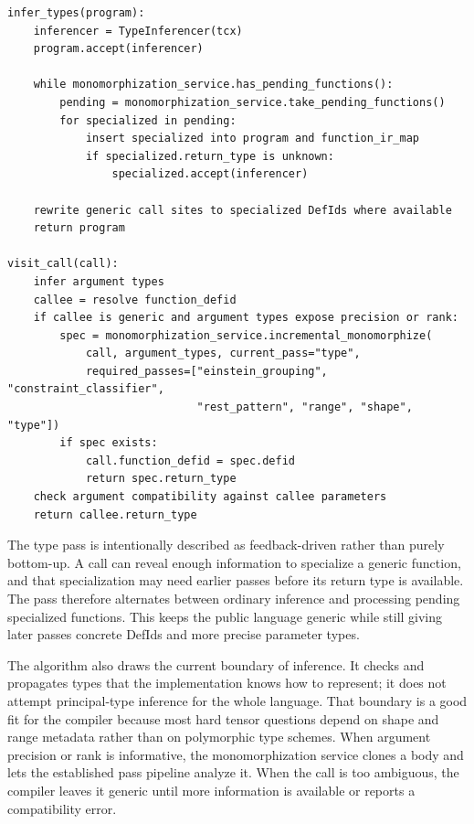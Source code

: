 \begin{lstlisting}[style=pythoncode,caption={Type checking with specialization feedback.}]
infer_types(program):
    inferencer = TypeInferencer(tcx)
    program.accept(inferencer)

    while monomorphization_service.has_pending_functions():
        pending = monomorphization_service.take_pending_functions()
        for specialized in pending:
            insert specialized into program and function_ir_map
            if specialized.return_type is unknown:
                specialized.accept(inferencer)

    rewrite generic call sites to specialized DefIds where available
    return program

visit_call(call):
    infer argument types
    callee = resolve function_defid
    if callee is generic and argument types expose precision or rank:
        spec = monomorphization_service.incremental_monomorphize(
            call, argument_types, current_pass="type",
            required_passes=["einstein_grouping", "constraint_classifier",
                             "rest_pattern", "range", "shape", "type"])
        if spec exists:
            call.function_defid = spec.defid
            return spec.return_type
    check argument compatibility against callee parameters
    return callee.return_type
\end{lstlisting}

The type pass is intentionally described as feedback-driven rather than purely
bottom-up. A call can reveal enough information to specialize a generic
function, and that specialization may need earlier passes before its return
type is available. The pass therefore alternates between ordinary inference and
processing pending specialized functions. This keeps the public language
generic while still giving later passes concrete DefIds and more precise
parameter types.

The algorithm also draws the current boundary of inference. It checks and
propagates types that the implementation knows how to represent; it does not
attempt principal-type inference for the whole language. That boundary is a
good fit for the compiler because most hard tensor questions depend on shape
and range metadata rather than on polymorphic type schemes. When argument
precision or rank is informative, the monomorphization service clones a body
and lets the established pass pipeline analyze it. When the call is too
ambiguous, the compiler leaves it generic until more information is available
or reports a compatibility error.

